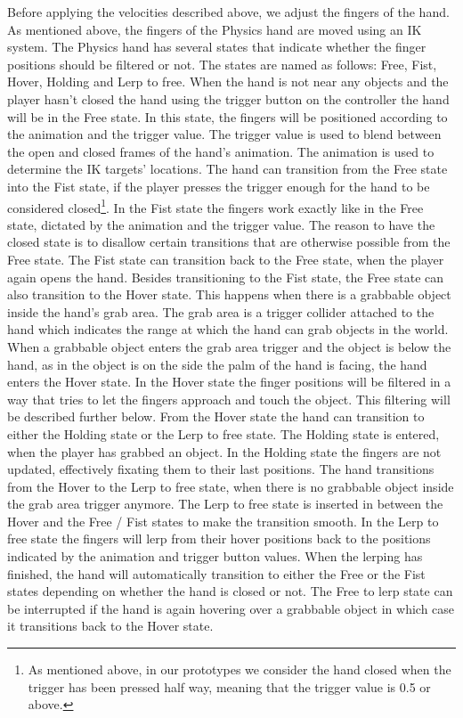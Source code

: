 Before applying the velocities described above, we adjust the fingers of the hand. As mentioned above, the fingers of the Physics hand are moved using an IK system. The Physics hand has several states that indicate whether the finger positions should be filtered or not. The states are named as follows: Free, Fist, Hover, Holding and Lerp to free. When the hand is not near any objects and the player hasn't closed the hand using the trigger button on the controller the hand will be in the Free state. In this state, the fingers will be positioned according to the animation and the trigger value. The trigger value is used to blend between the open and closed frames of the hand's animation. The animation is used to determine the IK targets' locations. The hand can transition from the Free state into the Fist state, if the player presses the trigger enough for the hand to be considered closed\footnote{As mentioned above, in our prototypes we consider the hand closed when the trigger has been pressed half way, meaning that the trigger value is 0.5 or above.}. In the Fist state the fingers work exactly like in the Free state, dictated by the animation and the trigger value. The reason to have the closed state is to disallow certain transitions that are otherwise possible from the Free state. The Fist state can transition back to the Free state, when the player again opens the hand. Besides transitioning to the Fist state, the Free state can also transition to the Hover state. This happens when there is a grabbable object inside the hand's grab area. The grab area is a trigger collider attached to the hand which indicates the range at which the hand can grab objects in the world. When a grabbable object enters the grab area trigger and the object is below the hand, as in the object is on the side the palm of the hand is facing, the hand enters the Hover state. In the Hover state the finger positions will be filtered in a way that tries to let the fingers approach and touch the object. This filtering will be described further below. From the Hover state the hand can transition to either the Holding state or the Lerp to free state. The Holding state is entered, when the player has grabbed an object. In the Holding state the fingers are not updated, effectively fixating them to their last positions. The hand transitions from the Hover to the Lerp to free state, when there is no grabbable object inside the grab area trigger anymore. The Lerp to free state is inserted in between the Hover and the Free / Fist states to make the transition smooth. In the Lerp to free state the fingers will lerp from their hover positions back to the positions indicated by the animation and trigger button values. When the lerping has finished, the hand will automatically transition to either the Free or the Fist states depending on whether the hand is closed or not. The Free to lerp state can be interrupted if the hand is again hovering over a grabbable object in which case it transitions back to the Hover state.

